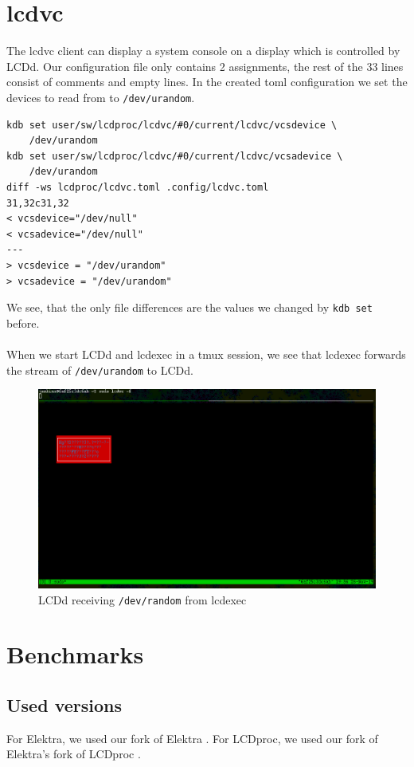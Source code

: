 \documentclass[draft,final]{vutinfth} %
\begin{document}
\section{lcdvc}
The lcdvc client can display a system console on a display which is controlled by LCDd.
Our configuration file only contains 2 assignments, the rest of the 33 lines consist of comments and empty lines.
In the created \acrshort{toml} configuration we set the devices to read from to \texttt{/dev/urandom}.
\begin{Verbatim}[frame=single, fontsize=\small]
kdb set user/sw/lcdproc/lcdvc/#0/current/lcdvc/vcsdevice \
    /dev/urandom
kdb set user/sw/lcdproc/lcdvc/#0/current/lcdvc/vcsadevice \
    /dev/urandom
diff -ws lcdproc/lcdvc.toml .config/lcdvc.toml
31,32c31,32
< vcsdevice="/dev/null"
< vcsadevice="/dev/null"
---
> vcsdevice = "/dev/urandom"
> vcsadevice = "/dev/urandom"
\end{Verbatim}
We see, that the only file differences are the values we changed by \texttt{kdb set} before.
\\\\
When we start LCDd and lcdexec in a \acrshort{tmux} session, we see that lcdexec forwards the stream of \texttt{/dev/urandom} to LCDd.
\FloatBarrier
\begin{figure}[h!]
	\centering
		\includegraphics[width=\linewidth]{graphics/lcdvc.png}
  \caption{LCDd receiving \texttt{/dev/random} from lcdexec}
\label{fig:lcdvc}
\end{figure}
\FloatBarrier

\section{Benchmarks}

\subsection{Used versions}
For Elektra, we used our fork of Elektra \cite{bauhausforkelektra}.
For LCDproc, we used our fork of Elektra's fork of LCDproc \cite{bauhausforklcdproc}.
\end{document}
